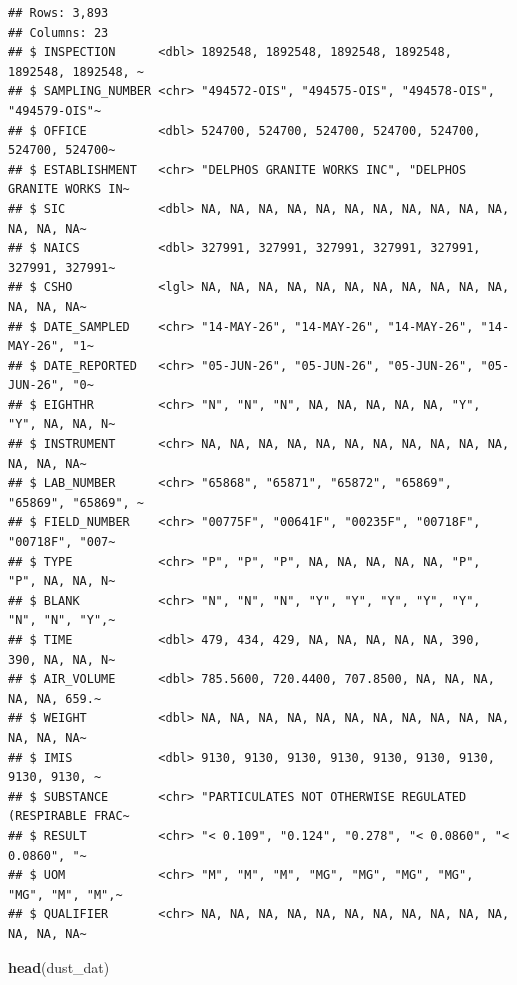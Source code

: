 \documentclass[
]{article}
\newenvironment{Shaded}{\begin{snugshade}}{\end{snugshade}}
\newcommand{\FunctionTok}[1]{\textcolor[rgb]{0.13,0.29,0.53}{\textbf{#1}}}
\newcommand{\NormalTok}[1]{#1}
\begin{document}
\begin{verbatim}
## Rows: 3,893
## Columns: 23
## $ INSPECTION      <dbl> 1892548, 1892548, 1892548, 1892548, 1892548, 1892548, ~
## $ SAMPLING_NUMBER <chr> "494572-OIS", "494575-OIS", "494578-OIS", "494579-OIS"~
## $ OFFICE          <dbl> 524700, 524700, 524700, 524700, 524700, 524700, 524700~
## $ ESTABLISHMENT   <chr> "DELPHOS GRANITE WORKS INC", "DELPHOS GRANITE WORKS IN~
## $ SIC             <dbl> NA, NA, NA, NA, NA, NA, NA, NA, NA, NA, NA, NA, NA, NA~
## $ NAICS           <dbl> 327991, 327991, 327991, 327991, 327991, 327991, 327991~
## $ CSHO            <lgl> NA, NA, NA, NA, NA, NA, NA, NA, NA, NA, NA, NA, NA, NA~
## $ DATE_SAMPLED    <chr> "14-MAY-26", "14-MAY-26", "14-MAY-26", "14-MAY-26", "1~
## $ DATE_REPORTED   <chr> "05-JUN-26", "05-JUN-26", "05-JUN-26", "05-JUN-26", "0~
## $ EIGHTHR         <chr> "N", "N", "N", NA, NA, NA, NA, NA, "Y", "Y", NA, NA, N~
## $ INSTRUMENT      <chr> NA, NA, NA, NA, NA, NA, NA, NA, NA, NA, NA, NA, NA, NA~
## $ LAB_NUMBER      <chr> "65868", "65871", "65872", "65869", "65869", "65869", ~
## $ FIELD_NUMBER    <chr> "00775F", "00641F", "00235F", "00718F", "00718F", "007~
## $ TYPE            <chr> "P", "P", "P", NA, NA, NA, NA, NA, "P", "P", NA, NA, N~
## $ BLANK           <chr> "N", "N", "N", "Y", "Y", "Y", "Y", "Y", "N", "N", "Y",~
## $ TIME            <dbl> 479, 434, 429, NA, NA, NA, NA, NA, 390, 390, NA, NA, N~
## $ AIR_VOLUME      <dbl> 785.5600, 720.4400, 707.8500, NA, NA, NA, NA, NA, 659.~
## $ WEIGHT          <dbl> NA, NA, NA, NA, NA, NA, NA, NA, NA, NA, NA, NA, NA, NA~
## $ IMIS            <dbl> 9130, 9130, 9130, 9130, 9130, 9130, 9130, 9130, 9130, ~
## $ SUBSTANCE       <chr> "PARTICULATES NOT OTHERWISE REGULATED (RESPIRABLE FRAC~
## $ RESULT          <chr> "< 0.109", "0.124", "0.278", "< 0.0860", "< 0.0860", "~
## $ UOM             <chr> "M", "M", "M", "MG", "MG", "MG", "MG", "MG", "M", "M",~
## $ QUALIFIER       <chr> NA, NA, NA, NA, NA, NA, NA, NA, NA, NA, NA, NA, NA, NA~
\end{verbatim}

\begin{Shaded}
\begin{Highlighting}[]
\FunctionTok{head}\NormalTok{(dust\_dat) }
\end{Highlighting}
\end{Shaded}
\end{document}
